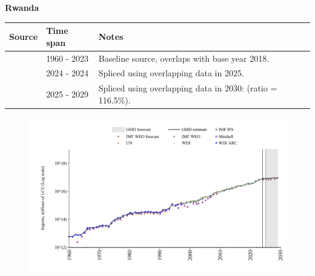 \documentclass[12pt,a4paper,landscape]{article}
\begin{document}
\begin{adjustbox}{max totalsize={\paperwidth}{\paperheight},center}
\begin{minipage}[t][\textheight][t]{\textwidth}
\vspace*{0.5cm}
{}
\begin{center}
{\Large\bfseries Rwanda}
\end{center}
\vspace{0.5cm}
\begin{table}[H]
\centering
\small
\begin{tabular}{|l|l|l|}
\hline
\textbf{Source} & \textbf{Time span} & \textbf{Notes} \\
\hline
\rowcolor{white}\cite{WDI}& 1960 - 2023 &Baseline source, overlaps with base year 2018.\\
\rowcolor{lightgray}\cite{IMF_IFS}& 2024 - 2024 &Spliced using overlapping data in 2025.\\
\rowcolor{white}\cite{IMF_WEO_forecast}& 2025 - 2029 &Spliced using overlapping data in 2030: (ratio = 116.5\%).\\
\hline
\end{tabular}
\end{table}
\begin{figure}[H]
\centering
\includegraphics[width=\textwidth,height=0.6\textheight,keepaspectratio]{graphs/RWA_imports.pdf}
\end{figure}
\end{minipage}
\end{adjustbox}
\end{document}
